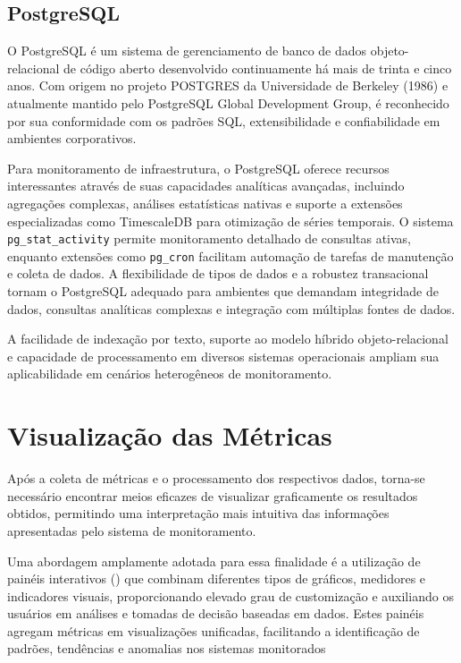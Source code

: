 \subsection{PostgreSQL}
\label{subsection:PostgreSQL}

O PostgreSQL \citep{postgresql2025} é um sistema de gerenciamento de banco de dados objeto-relacional de código aberto desenvolvido continuamente há mais de trinta e cinco anos. Com origem no projeto POSTGRES da Universidade de Berkeley (1986) e atualmente mantido pelo PostgreSQL Global Development Group, é reconhecido por sua conformidade com os padrões SQL, extensibilidade e confiabilidade em ambientes corporativos.

Para monitoramento de infraestrutura, o PostgreSQL oferece recursos interessantes através de suas capacidades analíticas avançadas, incluindo agregações complexas, análises estatísticas nativas e suporte a extensões especializadas como TimescaleDB \citep{timescaledb2025} para otimização de séries temporais. O sistema \verb|pg_stat_activity| permite monitoramento detalhado de consultas ativas, enquanto extensões como \verb|pg_cron| facilitam automação de tarefas de manutenção e coleta de dados. A flexibilidade de tipos de dados e a robustez transacional tornam o PostgreSQL adequado para ambientes que demandam integridade de dados, consultas analíticas complexas e integração com múltiplas fontes de dados.

A facilidade de indexação por texto, suporte ao modelo híbrido objeto-relacional e capacidade de processamento em diversos sistemas operacionais ampliam sua aplicabilidade em cenários heterogêneos de monitoramento.

\section{Visualização das Métricas}
\label{section:VisualizacaoMetricas}

Após a coleta de métricas e o processamento dos respectivos dados, torna-se necessário encontrar meios eficazes de visualizar graficamente os resultados obtidos, permitindo uma interpretação mais intuitiva das informações apresentadas pelo sistema de monitoramento.

Uma abordagem amplamente adotada para essa finalidade é a utilização de painéis interativos () que combinam diferentes tipos de gráficos, medidores e indicadores visuais, proporcionando elevado grau de customização e auxiliando os usuários em análises e tomadas de decisão baseadas em dados. Estes painéis agregam métricas em visualizações unificadas, facilitando a identificação de padrões, tendências e anomalias nos sistemas monitorados

